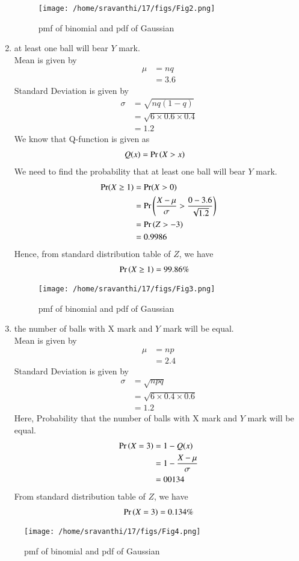 \documentclass[journal,12pt,twocolumn]{IEEEtran}
\theoremstyle{remark}
\begin{document}
\begin{enumerate}
\begin{figure}
\texttt{[image: /home/sravanthi/17/figs/Fig2.png]}
\caption{pmf of binomial and pdf of Gaussian }
\label{fig:gaussian/9/3/17/}
\end{figure}
\item at least one ball will bear $Y$ mark.\\
Mean is given by
\begin{align}
	\mu &= nq \\
	&= 3.6
\end{align}
Standard Deviation is given by
\begin{align}
	\sigma &= \sqrt{nq(1 - q)}\\
	&= \sqrt{6 \times 0.6 \times 0.4}\\
	&=  1.2
\end{align}
We know that Q-function is given as\\
\begin{align}
Q(x) &= \Pr\left(X > x\right)
\end{align}
We need to find the probability that at least one ball will bear $Y$ mark.
\begin{align}
	\Pr(X \geq 1) &=\Pr(X > 0)\\
	&= \Pr\left(\frac{X - \mu}{\sigma} > \frac{0 - 3.6}{\sqrt{1.2}}\right) \\
	&=\Pr\left(Z > -3\right) \\
	&=0.9986\\
\end{align}
Hence, from standard distribution table of $Z$, we have
\begin{align}
	\Pr\left(X \geq 1\right) &=99.86\%
\end{align}
\begin{figure}
\texttt{[image: /home/sravanthi/17/figs/Fig3.png]}
\caption{pmf of binomial and pdf of Gaussian }
\label{fig:gaussian/9/3/17/}
\end{figure}
\item the number of balls with X mark and $Y$ mark will be equal.\\
Mean is given by
\begin{align}
	\mu &= np \\
	&= 2.4
\end{align}
Standard Deviation is given by
\begin{align}
	\sigma &= \sqrt{npq}\\
	&= \sqrt{6 \times 0.4 \times 0.6}\\
	&=  1.2
\end{align}
Here, Probability that the number of balls with X mark and $Y$ mark will be equal.
\begin{align}
\Pr\left(X = 3\right) &= 1 - Q(x)\\
 &= 1-\frac{X - \mu}{\sigma} \\
	&= 00134\\        
\end{align}
From standard distribution table of $Z$, we have
\begin{align}
	\Pr\left(X = 3\right)=0.134\%
\end{align}
\end{enumerate}

\begin{figure}
\texttt{[image: /home/sravanthi/17/figs/Fig4.png]}
\caption{pmf of binomial and pdf of Gaussian }
\label{fig:gaussian/9/3/17/}
\end{figure}
\end{document}
